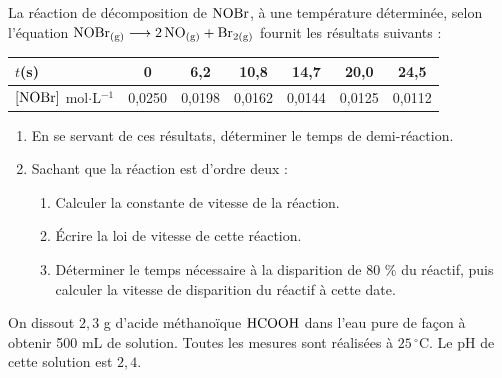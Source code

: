 \documentclass[11pt]{article}
\begin{document}


La réaction de décomposition de $\mathrm{NOBr}$, à une température déterminée, selon l'équation $\mathrm{NOBr_{(g)} \longrightarrow 2\,NO_{(g)} + Br_{2(g)}}$ fournit les résultats suivants :

\begin{center}\renewcommand{\arraystretch}{1.3}
\begin{tabular}{|l|c|c|c|c|c|c|}
\hline
$t$(s) & 0 & 6,2 & 10,8 & 14,7 & 20,0 & 24,5 \\
\hline
$[\mathrm{NOBr}]$ mol$\cdot$L$^{-1}$ & 0,0250 & 0,0198 & 0,0162 & 0,0144 & 0,0125 & 0,0112 \\
\hline
\end{tabular}
\end{center}

\begin{enumerate}
  \item En se servant de ces résultats, déterminer le temps de demi-réaction.
  \item Sachant que la réaction est d'ordre deux :
  \begin{enumerate}[label=\alph*.]
    \item Calculer la constante de vitesse de la réaction.
    \item Écrire la loi de vitesse de cette réaction.
    \item Déterminer le temps nécessaire à la disparition de 80 \% du réactif, puis calculer la vitesse de disparition du réactif à cette date.
  \end{enumerate}
\end{enumerate}

On dissout $2{,}3$ g d'acide méthanoïque $\mathrm{HCOOH}$ dans l'eau pure de façon à obtenir 500 mL de solution. Toutes les mesures sont réalisées à $25\,^\circ$C. Le pH de cette solution est $2{,}4$.
\end{document}
